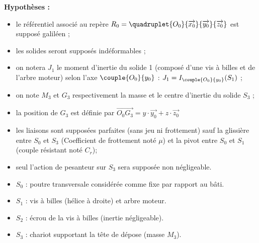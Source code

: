 \textbf{Hypothèses :}
\begin{itemize}
\item le référentiel associé au repère $R_0=\quadruplet{O_0}{\overrightarrow{x_0}}{\overrightarrow{y_0}}{\overrightarrow{z_0}}$ est supposé galiléen ;
\item les solides seront supposés indéformables ; 
\item on notera $J_1$ le moment d'inertie du solide 1 (composé d'une vis à billes et de l'arbre moteur) selon l'axe $\couple{O_0}{{y_0}}$ : $J_1=I_{\couple{O_0}{{y_0}}}(S_1)$ ;
\item on note $M_3$ et $G_3$ respectivement la masse et le centre d'inertie du solide $S_3$ ;
\item la position de $G_3$ est définie par $\overrightarrow{O_0G_3}=y\cdot \overrightarrow{y_0}+z\cdot \overrightarrow{z_0}$
\item les liaisons sont supposées parfaites (sans jeu ni frottement) sauf la glissière entre $S_0$ et $S_3$ (Coefficient de frottement noté $\mu$) et la pivot entre $S_0$ et $S_1$ (couple résistant noté $C_r$);
\item seul l'action de pesanteur sur $S_3$ sera supposée non négligeable.
\end{itemize}





\begin{itemize}
\item $S_0$ : poutre transversale considérée comme fixe par rapport au bâti.
\item $S_1$ : vis à billes (hélice à droite) et arbre moteur.
\item $S_2$ : écrou de la vis à billes (inertie négligeable).
\item $S_3$ : chariot supportant la tête de dépose (masse $M_3$).
\end{itemize}




